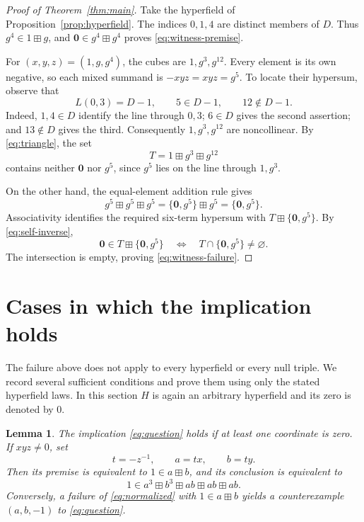 \documentclass[11pt]{article}
\newtheorem{lemma}[theorem]{Lemma}
\theoremstyle{remark}
\newcommand{\hz}{\mathbf 0}
\newcommand{\hs}{\boxplus}
\begin{document}
\begin{proof}[Proof of Theorem~\ref{thm:main}]
Take the hyperfield of Proposition~\ref{prop:hyperfield}.
The indices $0,1,4$ are distinct members of $D$. Thus
$g^4\in 1\hs g$, and $\hz\in g^4\hs g^4$ proves
\eqref{eq:witness-premise}.

For $(x,y,z)=(1,g,g^4)$, the cubes are $1,g^3,g^{12}$.
Every element is its own negative, so each mixed summand is
$-xyz=xyz=g^5$. To locate their hypersum, observe that
\begin{equation}\label{eq:key-line}
 L(0,3)=D-1,\qquad 5\in D-1,\qquad 12\notin D-1.
\end{equation}
Indeed, $1,4\in D$ identify the line through $0,3$;
$6\in D$ gives the second assertion; and $13\notin D$ gives the third.
Consequently $1,g^3,g^{12}$ are noncollinear. By
\eqref{eq:triangle}, the set
\[
 T=1\hs g^3\hs g^{12}
\]
contains neither $\hz$ nor $g^5$, since $g^5$ lies on the line
through $1,g^3$.

On the other hand, the equal-element addition rule gives
\[
 g^5\hs g^5\hs g^5
 =\{\hz,g^5\}\hs g^5=\{\hz,g^5\}.
\]
Associativity identifies the required six-term hypersum with
$T\hs\{\hz,g^5\}$. By \eqref{eq:self-inverse},
\[
 \hz\in T\hs\{\hz,g^5\}
 \quad\Longleftrightarrow\quad
 T\cap\{\hz,g^5\}\ne\varnothing.
\]
The intersection is empty, proving \eqref{eq:witness-failure}.
\end{proof}

\section{Cases in which the implication holds}\label{sec:positive}

The failure above does not apply to every hyperfield or every null
triple. We record several sufficient conditions and prove them using
only the stated hyperfield laws. In this section $H$ is again an
arbitrary hyperfield and its zero is denoted by $0$.

\begin{lemma}\label{lem:normalization}
The implication \eqref{eq:question} holds if at least one coordinate
is zero. If $xyz\ne0$, set
\[
 t=-z^{-1},\qquad a=tx,\qquad b=ty.
\]
Then its premise is equivalent to $1\in a\hs b$, and its conclusion
is equivalent to
\begin{equation}\label{eq:normalized}
 1\in a^3\hs b^3\hs ab\hs ab\hs ab.
\end{equation}
Conversely, a failure of \eqref{eq:normalized} with $1\in a\hs b$
yields a counterexample $(a,b,-1)$ to \eqref{eq:question}.
\end{lemma}
\end{document}
